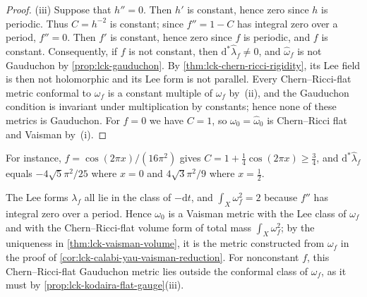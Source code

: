 \begin{proof}
(iii) Suppose that $h''=0$. Then $h'$ is constant, hence zero since $h$ is periodic. Thus $C=h^{-2}$ is constant; since $f''=1-C$ has integral zero over a period, $f''=0$. Then $f'$ is constant, hence zero since $f$ is periodic, and $f$ is constant. Consequently, if $f$ is not constant, then $\mathrm d^*\widehat\lambda_f\neq0$, and $\widehat\omega_f$ is not Gauduchon by \cref{prop:lck-gauduchon}. By \cref{thm:lck-chern-ricci-rigidity}, its Lee field is then not holomorphic and its Lee form is not parallel. Every Chern--Ricci-flat metric conformal to $\omega_f$ is a constant multiple of $\widehat\omega_f$ by~(ii), and the Gauduchon condition is invariant under multiplication by constants; hence none of these metrics is Gauduchon. For $f=0$ we have $C=1$, so $\omega_0=\widehat\omega_0$ is Chern--Ricci flat and Vaisman by~(i).
\end{proof}

For instance, $f=\cos(2\pi x)/(16\pi^2)$ gives $C=1+\frac14\cos(2\pi x)\geq\frac34$, and $\mathrm d^*\widehat\lambda_f$ equals $-4\sqrt5\pi^2/25$ where $x=0$ and $4\sqrt3\pi^2/9$ where $x=\frac12$.

The Lee forms $\lambda_f$ all lie in the class of $-\mathrm dt$, and $\int_X\omega_f^2=2$ because $f''$ has integral zero over a period. Hence $\omega_0$ is a Vaisman metric with the Lee class of $\omega_f$ and with the Chern--Ricci-flat volume form of total mass $\int_X\omega_f^2$; by the uniqueness in \cref{thm:lck-vaisman-volume}, it is the metric constructed from $\omega_f$ in the proof of \cref{cor:lck-calabi-yau-vaisman-reduction}. For nonconstant $f$, this Chern--Ricci-flat Gauduchon metric lies outside the conformal class of $\omega_f$, as it must by \cref{prop:lck-kodaira-flat-gauge}(iii).
